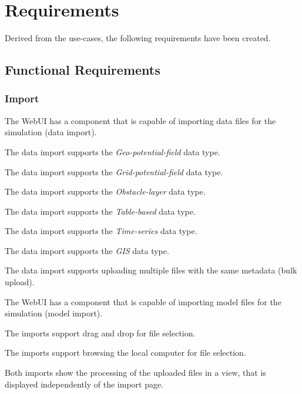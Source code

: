\begin{usecase}
\end{usecase}



\section{Requirements}
\label{sec:requirements}
Derived from the use-cases, the following requirements have been created.


\subsection{Functional Requirements}

\subsubsection{Import}
\reqstartF
\item The WebUI has a component that is capable of importing data files for the simulation (data import).
\item The data import supports the \textit{Geo-potential-field} data type.
\item The data import supports the \textit{Grid-potential-field} data type.
\item The data import supports the \textit{Obstacle-layer} data type.
\item The data import supports the \textit{Table-based} data type.
\item The data import supports the \textit{Time-series} data type.
\item The data import supports the \textit{GIS} data type.
\item The data import supports uploading multiple files with the same metadata (bulk upload).
\item The WebUI has a component that is capable of importing model files for the simulation (model import).
\item The imports support drag and drop for file selection.
\item The imports support browsing the local computer for file selection.
\item Both imports show the processing of the uploaded files in a view, that is displayed independently of the import page.
\reqendF


